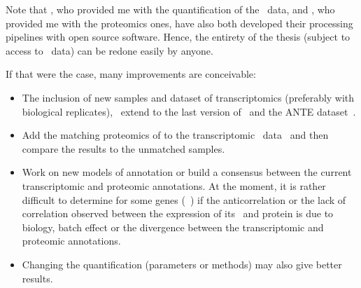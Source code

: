Note that \nuno, who provided me with the quantification of the \gtex\ data,
and \james, who provided me with the proteomics ones,
have also both developed their processing pipelines with open source software.
Hence, the entirety of the thesis (subject to access to \gtex\ data)
can be redone easily by anyone.


If that were the case, many improvements are conceivable:
\vspace{-2mm}
\begin{itemize}[topsep=0pt,nosep]
        \item The inclusion of new samples and dataset of transcriptomics
            (preferably with biological replicates),
            \eg\ extend to the last version of \gtex\ and
            the ANTE dataset~.
        \item Add the matching proteomics of \citet{Wang2019-ut}
            to the transcriptomic \uhlen\ data~
            and then compare the results to the unmatched samples.
        \item Work on new models of annotation or
            build a consensus between the current transcriptomic and proteomic
            annotations.
            At the moment, it is rather difficult to determine for some genes
            (\eg\ )
            if the anticorrelation or the lack of correlation observed
            between the expression of its \mRNA\ and protein is due to biology,
            batch effect or the divergence between the transcriptomic and
            proteomic annotations.
        \item Changing the quantification (parameters or methods)
            may also give better results.
\end{itemize}

